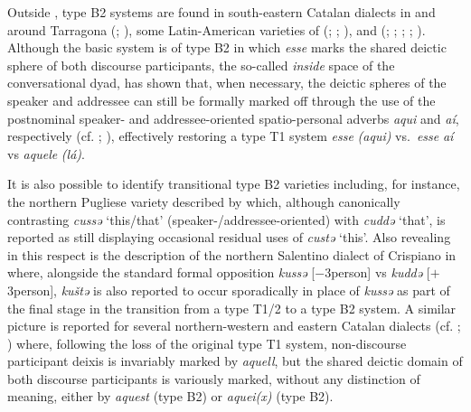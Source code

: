 \documentclass[output=paper]{langsci/langscibook}
\begin{document}
Outside , type B2 systems are found in south-eastern
Catalan dialects in and around Tarragona
(\citealt[141]{Badia-i-Margarit:1991a}; \citealt[501]{Badia-i-Margarit:1995a}),
some Latin-American varieties of  (\citealt[170]{Kany:1945a};
\citealt[434]{Zamora-Vicente:1967a}; \citealt[42, 44]{Stavinschi:2009a}), and
 (\citealt{Camara:1971a}; \citealt[114f]{Teyssier:1976a};
\citealt{Jungbluth:2000a}; \citealt[§5]{Jungbluth:2017a};
\citealt[317--319]{Jungbluth:2015a}). Although the basic 
system is of type B2 in which \emph{esse} marks the shared deictic
sphere of both discourse participants, the so-called \emph{inside} space of the
conversational dyad, \citet{Jungbluth:2000a} has shown that, when necessary,
the deictic spheres of the speaker and addressee can still be formally marked
off through the use of the postnominal speaker- and addressee-oriented
spatio-personal adverbs \emph{aqui} and \emph{aí}, respectively (cf.
\citealt[27--51]{Carvalho:1976a}; \citealt[317]{Jungbluth:2015a}), effectively
restoring a type T1 system \emph{esse} \emph{(aqui)} vs.\ \emph{esse} \emph{aí}
vs \emph{aquele} \emph{(lá)}.

It is also possible to identify transitional type B2 varieties
including, for instance, the northern Pugliese variety described by
\citet[201]{Imperio:1990a} which, although canonically contrasting \emph{cussə}
‘this/that’ (speaker-/addressee-oriented) with \emph{cuddə} ‘that’, is reported
as still displaying occasional residual uses of \emph{custə} ‘this’. Also
revealing in this respect is the description of the northern Salentino dialect
of Crispiano in \citet[155]{Mancarella:1998a} where, alongside the standard
formal opposition \emph{kussə} [$-$3person] vs \emph{kuddə}
[$+$3person], \emph{kuštə} is also reported to occur sporadically in place of
\emph{kussə} as part of the final stage in the transition from a type T1/2 to a
type B2 system. A similar picture is reported for several
northern-western and eastern Catalan dialects (cf.
\citealt[81]{Duarte-i-Montserrat:1986a}; \citealt[250]{Veny:1991a}) where,
following the loss of the original type T1 system, non-discourse participant
deixis is invariably marked by \emph{aquell}, but the shared deictic domain of
both discourse participants is variously marked, without any distinction of
meaning, either by \emph{aquest} (type B2) or \emph{aquei(x)} (type
B2).
\end{document}
